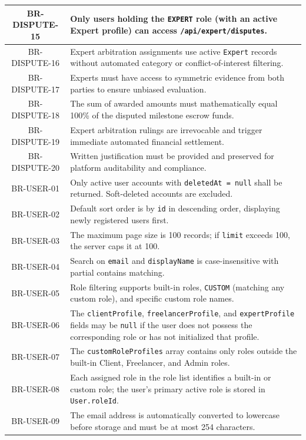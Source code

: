 \begin{longtable}{|c|p{12cm}|}
    BR-DISPUTE-15 & Only users holding the \texttt{EXPERT} role (with an active Expert profile) can access \texttt{/api/expert/disputes}. \\ \hline
    BR-DISPUTE-16 & Expert arbitration assignments use active \texttt{Expert} records without automated category or conflict-of-interest filtering. \\ \hline
    BR-DISPUTE-17 & Experts must have access to symmetric evidence from both parties to ensure unbiased evaluation. \\ \hline
    BR-DISPUTE-18 & The sum of awarded amounts must mathematically equal 100\% of the disputed milestone escrow funds. \\ \hline
    BR-DISPUTE-19 & Expert arbitration rulings are irrevocable and trigger immediate automated financial settlement. \\ \hline
    BR-DISPUTE-20 & Written justification must be provided and preserved for platform auditability and compliance. \\ \hline
    BR-USER-01 & Only active user accounts with \texttt{deletedAt = null} shall be returned. Soft-deleted accounts are excluded. \\ \hline
    BR-USER-02 & Default sort order is by \texttt{id} in descending order, displaying newly registered users first. \\ \hline
    BR-USER-03 & The maximum page size is 100 records; if \texttt{limit} exceeds 100, the server caps it at 100. \\ \hline
    BR-USER-04 & Search on \texttt{email} and \texttt{displayName} is case-insensitive with partial contains matching. \\ \hline
    BR-USER-05 & Role filtering supports built-in roles, \texttt{CUSTOM} (matching any custom role), and specific custom role names. \\ \hline
    BR-USER-06 & The \texttt{clientProfile}, \texttt{freelancerProfile}, and \texttt{expertProfile} fields may be \texttt{null} if the user does not possess the corresponding role or has not initialized that profile. \\ \hline
    BR-USER-07 & The \texttt{customRoleProfiles} array contains only roles outside the built-in Client, Freelancer, and Admin roles. \\ \hline
    BR-USER-08 & Each assigned role in the role list identifies a built-in or custom role; the user's primary active role is stored in \texttt{User.roleId}. \\ \hline
    BR-USER-09 & The email address is automatically converted to lowercase before storage and must be at most 254 characters. \\ \hline

\end{longtable}
